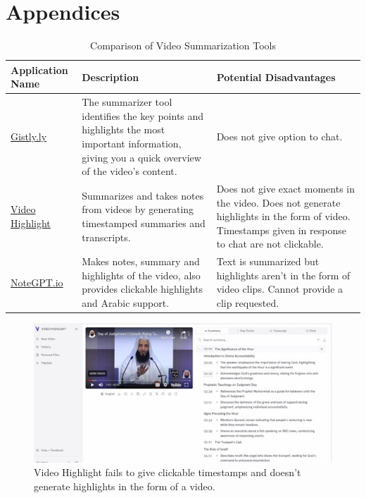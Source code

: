 \documentclass{bscs}
\begin{document}
\chapter{Appendices}

\begin{table}[h]
    \centering
    \begin{tabular}{|p{3cm}|p{7cm}|p{6cm}|}
        \hline
        \textbf{Application Name} & \textbf{Description} & \textbf{Potential Disadvantages} \\
        \hline
        \href{https://gistly.ly}{Gistly.ly} & The summarizer tool identifies the key points and highlights the most important information, giving you a quick overview of the video’s content. & Does not give option to chat. \\
        \hline
        \href{https://videohighlight.com}{Video Highlight} & Summarizes and takes notes from videos by generating timestamped summaries and transcripts. & Does not give exact moments in the video. Does not generate highlights in the form of video. Timestamps given in response to chat are not clickable. \\
        \hline
        \href{https://notegpt.io}{NoteGPT.io} & Makes notes, summary and highlights of the video, also provides clickable highlights and Arabic support. & Text is summarized but highlights aren’t in the form of video clips. Cannot provide a clip requested. \\
        \hline
    \end{tabular}
    \caption{Comparison of Video Summarization Tools}
\end{table}

\begin{figure}[p]
    \centering
    \includegraphics[width=1.1\textwidth]{figure_a.jpg}  
    \caption[Video Highlight Limitations]{Video Highlight fails to give clickable timestamps and doesn’t generate highlights in the form of a video.}
    \label{fig:video_highlight_limitations} 
\end{figure}
\end{document}
